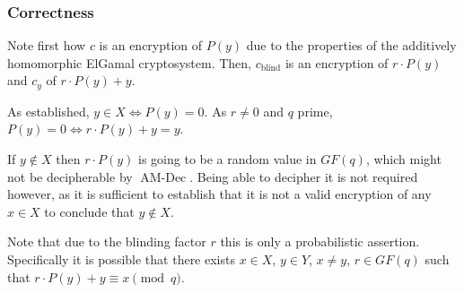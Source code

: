 \documentclass[a4paper]{scrreprt}
\begin{document}

\subsubsection{Correctness}

Note first how $c$ is an encryption of $P(y)$ due to the properties of the
additively homomorphic ElGamal cryptosystem. Then, $c_{\text{blind}}$ is an
encryption of $r \cdot P(y)$ and $c_y$ of $r \cdot P(y) + y$.

As established, $y \in X \Leftrightarrow P(y) = 0$. As $r \neq 0$ and $q$
prime, $P(y) = 0 \Leftrightarrow r \cdot P(y) + y = y$.

If $y \not \in X$ then $r \cdot P(y)$ is going to be a random value in $GF(q)$,
which might not be decipherable by $\operatorname{AM-Dec}$.  Being able to
decipher it is not required however, as it is sufficient to establish that it
is not a valid encryption of any $x \in X$ to conclude that $y \not \in X$.

Note that due to the blinding factor $r$ this is only a probabilistic
assertion. Specifically it is possible that there exists $x \in X$, $y \in Y$,
$x \neq y$, $r \in GF(q)$ such that $r \cdot P(y) + y \equiv x \pmod{q}$.
\end{document}

